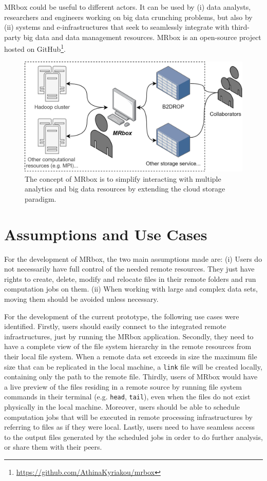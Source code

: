 MRbox could be useful to different actors. It can be used by (i) data analysts, researchers and engineers working on big data crunching problems, but also by (ii) systems and e-infrastructures that seek to seamlessly integrate with third-party big data and data management resources. MRbox is an open-source project hosted on GitHub\footnote{\url{https://github.com/AthinaKyriakou/mrbox}}.

\begin{figure}
    \centering
    \includegraphics[width=.4\textwidth]{mrbox.png}
    \caption{The concept of MRbox is to simplify interacting with multiple analytics and big data resources by extending the cloud storage paradigm.}
    \label{fig:mrbox}
\end{figure}

\section{Assumptions and Use Cases}

For the development of MRbox, the two main assumptions made are: (i) Users do not necessarily have full control of the needed remote resources. They just have rights to create, delete, modify and relocate files in their remote folders and run computation jobs on them. (ii) When working with large and complex data sets, moving them should be avoided unless necessary\cite{atkinson_malcolm_2018}.

For the development of the current prototype, the following use cases were identified. Firstly, users should easily connect to the integrated remote infrastructures, just by running the MRbox application. Secondly, they need to have a complete view of the file system hierarchy in the remote resources from their local file system. When a remote data set exceeds in size the maximum file size that can be replicated in the local machine, a \texttt{link} file will be created locally, containing only the path to the remote file. Thirdly, users of MRbox would have a live preview of the files residing in a remote source by running file system commands in their terminal (e.g. \texttt{head}, \texttt{tail}), even when the files do not exist physically in the local machine. Moreover, users should be able to schedule computation jobs that will be executed in remote processing infrastructures by referring to files as if they were local. Lastly, users need to have seamless access to the output files generated by the scheduled jobs in order to do further analysis, or share them with their peers.

